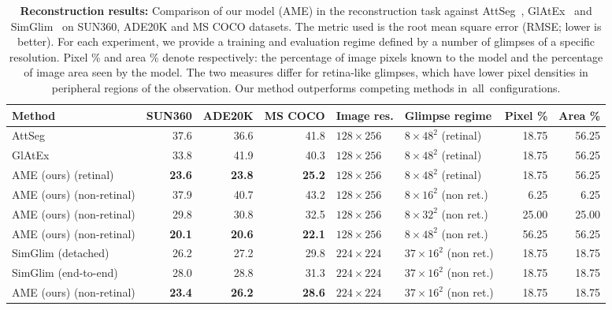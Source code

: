 \begin{table}[t]
    \caption[Reconstruction results across SUN360, ADE20K, and MS COCO]{\textbf{Reconstruction results:} Comparison of our model (AME) in the reconstruction task against AttSeg~\protect\cite{seifi2020segment}, GlAtEx~\protect\cite{seifi2021glimpse} and SimGlim~\protect\cite{Jha2023WACV} on SUN360, ADE20K and MS COCO datasets. The metric used is the root mean square error (RMSE; lower is better). For each experiment, we provide a training and evaluation regime defined by a number of glimpses of a specific resolution. Pixel \% and area \% denote respectively: the percentage of image pixels known to the model and the percentage of image area seen by the model. The two measures differ for retina-like glimpses, which have lower pixel densities in peripheral regions of the observation. Our method outperforms competing methods in~all~configurations.}
    \label{tab:ame-reconstruction}
    \begin{center}
    \begin{footnotesize}
    \begin{sc}
    \setlength{\tabcolsep}{4.5pt}
    \begin{tabular}{l@{\hspace{2pt}}rrrllrr}
    \toprule
    Method & SUN360 & ADE20K & MS COCO & Image res. & Glimpse regime & Pixel \% & Area \% \\
    \midrule
    AttSeg & 37.6 & 36.6 & 41.8 & $128 \times 256$ & $8 \times 48^2$ (retinal) & 18.75 & 56.25 \\
    GlAtEx & 33.8 & 41.9 & 40.3 & $128 \times 256$ & $8 \times 48^2$ (retinal) & 18.75 & 56.25 \\
    AME (ours) (retinal) & \textbf{23.6} & \textbf{23.8} & \textbf{25.2} & $128 \times 256$ & $8 \times 48^2$ (retinal) & 18.75 & 56.25\\
    \midrule
    AME (ours) (non-retinal) & 37.9 & 40.7 & 43.2 & $128 \times 256$ & $8 \times 16^2$ (non ret.) & 6.25 & 6.25\\
    AME (ours) (non-retinal) & 29.8 & 30.8 & 32.5 & $128 \times 256$ & $8 \times 32^2$ (non ret.) & 25.00 & 25.00\\
    AME (ours) (non-retinal) & \textbf{20.1} & \textbf{20.6} & \textbf{22.1} & $128 \times 256$ & $8 \times 48^2$ (non ret.) & 56.25 & 56.25 \\
    \midrule
    SimGlim (detached) & 26.2 & 27.2 & 29.8 & $224 \times 224$ & $37 \times 16^2$ (non ret.) & 18.75 & 18.75\\
    SimGlim (end-to-end) & 28.0 & 28.8 & 31.3 & $224 \times 224$ & $37 \times 16^2$ (non ret.) & 18.75 & 18.75 \\
    AME (ours) (non-retinal) & \textbf{23.4} & \textbf{26.2} & \textbf{28.6} & $224 \times 224$ & $37 \times 16^2$ (non ret.) & 18.75 & 18.75 \\
    \bottomrule
    \end{tabular}
    \end{sc}
    \end{footnotesize}
    \end{center}
\end{table}

